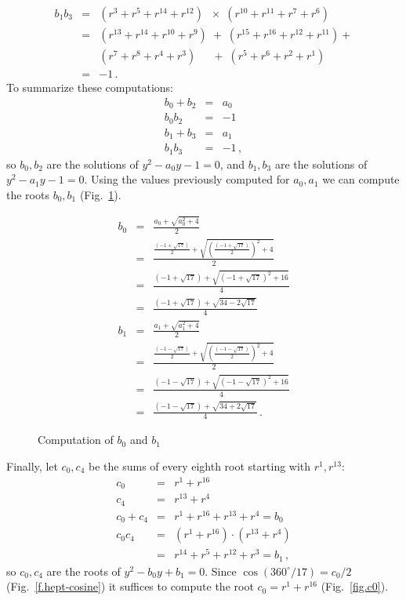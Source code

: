 \begin{eqnarray*}
b_1b_3&=&(r^3 + r^{5} + r^{14} +r^{12})\;\;\times\;(r^{10} + r^{11} + r^{7} +r^{6})\\
&=&(r^{13}+r^{14}+r^{10}+r^9)\;+\;(r^{15}+r^{16}+r^{12}+r^{11})+\\
&&(r^{7}+r^{8}+r^4+r^3)\quad\;\, +\;(r^{5}+r^{6}+r^{2}+r^1)\\
&=&-1\,.
\end{eqnarray*}
To summarize these computations:
\begin{eqnarray*}
b_0+b_2&=&a_0\\
b_0b_2&=&-1\\
b_1+b_3&=&a_1\\
b_1b_3&=&-1\,,
\end{eqnarray*}
so $b_0,b_2$ are the solutions of $y^2-a_0y-1= 0$, and $b_1,b_3$ are the solutions of $y^2-a_1y-1 =0$. Using the values previously computed for $a_0,a_1$ we can compute the roots $b_0,b_1$ (Fig.~\ref{f.b0b1}).
\begin{figure}[t]
\begin{eqnarray*}
b_0&=&\frac{a_0+\sqrt{a_0^2+4}}{2}\\
&=&\frac{
     \displaystyle\frac{(-1+\sqrt{17})}{2} + 
     \sqrt{\left(\displaystyle\frac{(-1+\sqrt{17})}{2}\right)^2+4}
   }{2}\\
&=&\frac{
     (-1+\sqrt{17}) + 
     \sqrt{\left(-1+\sqrt{17}\right)^2+16}
   }{4}\\
&=&\frac{
     (-1+\sqrt{17}) + 
     \sqrt{34-2\sqrt{17}}
   }{4}\\
b_1&=&\frac{a_1+\sqrt{a_1^2+4}}{2}\\
&=&\frac{
     \displaystyle\frac{(-1-\sqrt{17})}{2} + 
     \sqrt{\left(\displaystyle\frac{(-1-\sqrt{17})}{2}\right)^2+4}
   }{2}\\
&=&\frac{
     (-1-\sqrt{17}) + 
     \sqrt{\left(-1-\sqrt{17}\right)^2+16}
   }{4}\\
&=&\frac{
     (-1-\sqrt{17}) + 
     \sqrt{34+2\sqrt{17}}
   }{4}\,.
\end{eqnarray*}
\caption{Computation of $b_0$ and $b_1$}\label{f.b0b1}
\end{figure}

Finally, let $c_0,c_4$ be the sums of every eighth root starting with $r^1,r^{13}$:
\begin{eqnarray*}
c_0&=&r^1+r^{16}\\
c_4&=&r^{13}+r^4\\
c_0+c_4&=&r^1+r^{16}+r^{13}+r^4=b_0\\
c_0c_4&=&(r^1+r^{16})\cdot(r^{13}+r^4)\\
&=&r^{14}+r^5+r^{12}+r^3=b_1\,,
\end{eqnarray*}
so $c_0,c_4$ are the roots of $y^2-b_0y+b_1=0$. Since $\cos(360^\circ/17) = c_0/2$ (Fig.~\ref{f.hept-cosine}) it suffices to compute the root $c_0=r^1+r^{16}$ (Fig.~\ref{fig.c0}).

